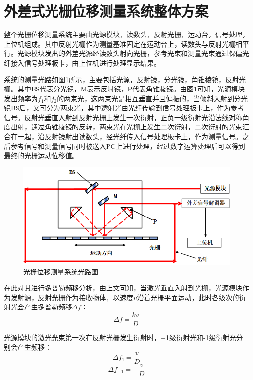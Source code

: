 \documentclass[type=master,oneside]{fduthesis}
\begin{document}
\section{外差式光栅位移测量系统整体方案}
整个光栅位移测量系统主要由光源模块，读数头，反射光栅，运动台，信号处理，上位机组成。其中反射光栅作为测量基准固定在运动台上，读数头与反射光栅相平行。光源模块发出的外差光源经读数头射向光栅，参考光束和测量光束通过保偏光纤接入信号处理板卡，由上位机进行处理显示结果。

系统的测量光路如图\ref{fig:光栅位移测量系统光路图}所示，主要包括光源，反射镜，分光镜，角锥棱镜，反射光栅。其中BS代表分光镜，M表示反射镜，P代表角锥棱镜。由图\ref{fig:光栅位移测量系统光路图}可知，光源模块发出频率为$ f_{1}$和$ f_{2}$的两束光，这两束光是相互垂直并且偏振的，当倾斜入射到分光镜BS后，又可分为两束光，其中透射光由光纤传输到信号处理板卡上，作为参考信号。反射光垂直入射到反射光栅上发生一次衍射，正负一级衍射光沿法线对称角度出射，通过角锥棱镜的反转，两束光在光栅上发生二次衍射，二次衍射的光束汇合在一起，沿反射镜射出读数头，经光纤传入信号处理板卡上，作为测量信号。之后参考信号和测量信号同时被送入PC上进行处理，经过数字运算处理后可以得到最终的光栅运动位移值。
\begin{figure}[htb]
  \centering
  \includegraphics[width=1\textwidth]{3-fig/光栅位移测量系统光路图.png}
  \caption{光栅位移测量系统光路图}
  \label{fig:光栅位移测量系统光路图}
\end{figure}

在此对其进行多普勒频移分析，由上文可知，当激光垂直入射到光栅，光源模块作为发射源，反射光栅作为接收物体，以速度$\upsilon $沿着光栅平面运动，此时各级次的衍射光会产生多普勒频移$\Delta f$：
\begin{equation}
  \Delta f=\frac{k v}{D}
\end{equation}

光源模块的激光光束第一次在反射光栅发生衍射时，+1级衍射光和-1级衍射光分别会产生频移：
\begin{equation}
  \Delta f_{1}=\frac{v}{D}
\end{equation}
\begin{equation}
  \Delta f_{-1}=-\frac{v}{D}
\end{equation}
\end{document}
